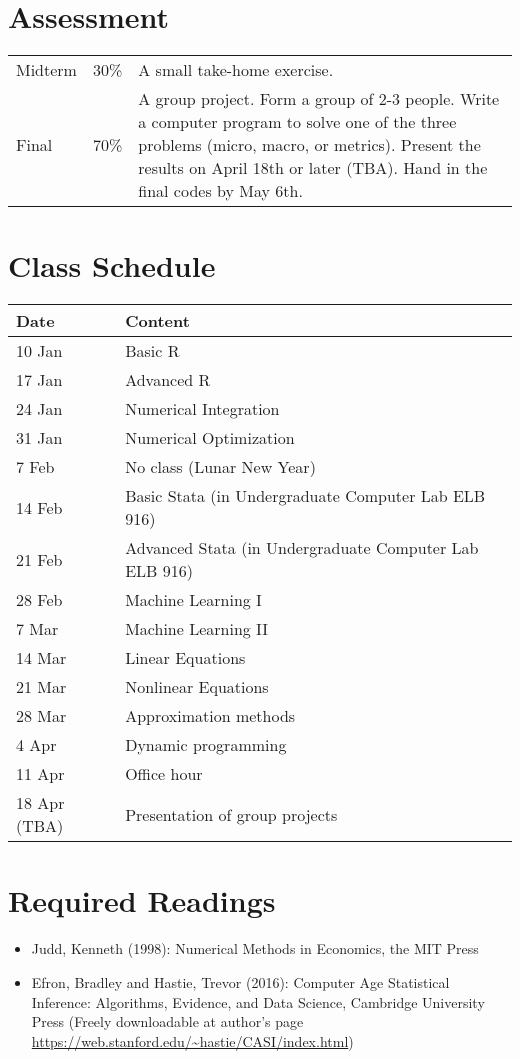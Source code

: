 \documentclass[11pt]{article}
\begin{document}
\section*{Assessment}
\begin{tabular}{p{0.5in}p{0.5in}p{5in}}
   Midterm & 30\% & A small take-home exercise. \\
   Final  & 70\%  & A group project. Form a group of 2-3 people. Write a computer program to solve one of the three problems (micro, macro, or metrics). Present the results on April 18th or later (TBA). Hand in the final codes by May 6th.
\end{tabular}

\section*{Class Schedule}
\begin{tabular}{p{1in}p{4in}}
  \hline
  Date & Content \\
  \hline
  10 Jan & Basic R \\
  17 Jan & Advanced R \\
  24 Jan & Numerical Integration  \\
  31 Jan & Numerical Optimization  \\
  7 Feb & No class (Lunar New Year)\\
  14 Feb & Basic Stata (in Undergraduate Computer Lab ELB 916) \\
  21 Feb & Advanced Stata (in Undergraduate Computer Lab ELB 916)\\
  28 Feb & Machine Learning I  \\
  7 Mar &  Machine Learning II \\
  14 Mar & Linear Equations \\
  21 Mar & Nonlinear Equations \\
  28 Mar & Approximation methods \\
  4 Apr & Dynamic programming \\
  11 Apr & Office hour \\
  18 Apr (TBA) & Presentation of group projects \\   
  \hline
\end{tabular}


\section*{Required Readings}
\begin{itemize}
\item Judd, Kenneth (1998): Numerical Methods in Economics, the MIT Press 
\item Efron, Bradley and Hastie, Trevor (2016): Computer Age Statistical Inference: Algorithms, Evidence, and Data Science, Cambridge University Press 
(Freely downloadable at author's page \url{https://web.stanford.edu/~hastie/CASI/index.html})
\end{itemize}
\end{document}
